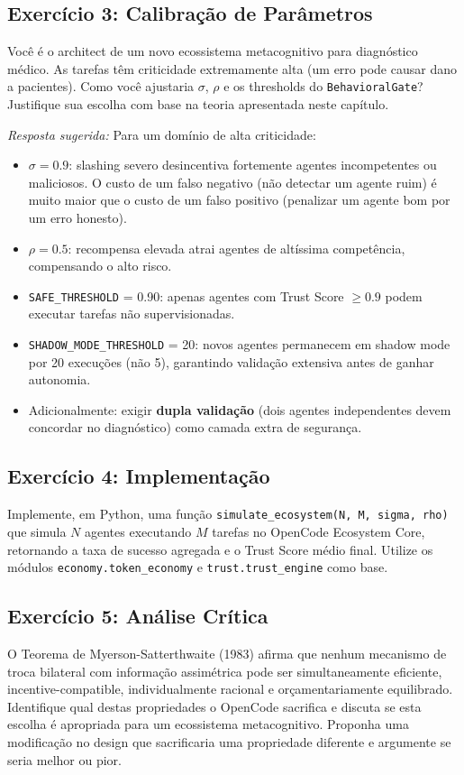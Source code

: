 \subsection*{Exercício 3: Calibração de Parâmetros}
Você é o architect de um novo ecossistema metacognitivo para diagnóstico médico. As tarefas têm criticidade extremamente alta (um erro pode causar dano a pacientes). Como você ajustaria $\sigma$, $\rho$ e os thresholds do \texttt{BehavioralGate}? Justifique sua escolha com base na teoria apresentada neste capítulo.

\textit{Resposta sugerida:} Para um domínio de alta criticidade:
\begin{itemize}
    \item $\sigma = 0.9$: slashing severo desincentiva fortemente agentes incompetentes ou maliciosos. O custo de um falso negativo (não detectar um agente ruim) é muito maior que o custo de um falso positivo (penalizar um agente bom por um erro honesto).
    \item $\rho = 0.5$: recompensa elevada atrai agentes de altíssima competência, compensando o alto risco.
    \item \texttt{SAFE\_THRESHOLD} = 0.90: apenas agentes com Trust Score $\geq 0.9$ podem executar tarefas não supervisionadas.
    \item \texttt{SHADOW\_MODE\_THRESHOLD} = 20: novos agentes permanecem em shadow mode por 20 execuções (não 5), garantindo validação extensiva antes de ganhar autonomia.
    \item Adicionalmente: exigir \textbf{dupla validação} (dois agentes independentes devem concordar no diagnóstico) como camada extra de segurança.
\end{itemize}

\subsection*{Exercício 4: Implementação}
Implemente, em Python, uma função \texttt{simulate\_ecosystem(N, M, sigma, rho)} que simula $N$ agentes executando $M$ tarefas no OpenCode Ecosystem Core, retornando a taxa de sucesso agregada e o Trust Score médio final. Utilize os módulos \texttt{economy.token\_economy} e \texttt{trust.trust\_engine} como base.

\subsection*{Exercício 5: Análise Crítica}
O Teorema de Myerson-Satterthwaite (1983) afirma que nenhum mecanismo de troca bilateral com informação assimétrica pode ser simultaneamente eficiente, incentive-compatible, individualmente racional e orçamentariamente equilibrado. Identifique qual destas propriedades o OpenCode sacrifica e discuta se esta escolha é apropriada para um ecossistema metacognitivo. Proponha uma modificação no design que sacrificaria uma propriedade diferente e argumente se seria melhor ou pior.


